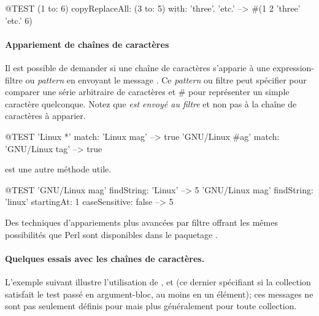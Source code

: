 \documentclass[a4paper,10pt,twoside]{book}
\begin{document}
\begin{code}{@TEST}
(1 to: 6) copyReplaceAll: (3 to: 5) with: { 'three'. 'etc.' } --> #(1 2 'three' 'etc.' 6)
\end{code}

\paragraph{Appariement de chaînes de caractères}

Il est possible de demander si une chaîne de caractères
s'apparie à  une expression-filtre ou \emph{pattern} en
envoyant le message .
Ce \emph{pattern} ou filtre peut spécifier \ct{*} pour
comparer une série arbitraire de caractères et \# 
pour représenter un simple caractère quelconque.
Notez que \emph{ est envoyé au filtre} et non pas à la chaîne
de caractères à apparier.
\begin{code}{@TEST}
'Linux *' match: 'Linux mag'           --> true
'GNU/Linux #ag' match: 'GNU/Linux tag' --> true
\end{code}

 est une autre méthode utile.
\begin{code}{@TEST}
'GNU/Linux mag' findString: 'Linux'                                                      --> 5
'GNU/Linux mag' findString: 'linux' startingAt: 1 caseSensitive: false  --> 5
\end{code}

Des techniques d'appariements plus avancées par filtre 
offrant les mêmes possibilités que Perl sont disponibles dans le
paquetage . %


\paragraph{Quelques essais avec les chaînes de caractères.} 
L'exemple suivant illustre l'utilisation de ,  et  
(ce dernier spécifiant si la collection satisfait le test passé en argument-bloc, au moins en un élément);
ces messages ne sont pas seulement définis pour  mais plus généralement pour toute collection.
\end{document}
